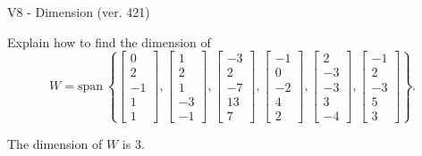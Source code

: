 \begin{exercise}
  \begin{exerciseTitle}V8 - Dimension (ver. 421)\end{exerciseTitle}
  \begin{exerciseStatement}
    Explain how to find the dimension of 
\[W=\mathrm{span}\ \left\{\left[\begin{array}{r}
0 \\
2 \\
-1 \\
1 \\
1
\end{array}\right] , \left[\begin{array}{r}
1 \\
2 \\
1 \\
-3 \\
-1
\end{array}\right] , \left[\begin{array}{r}
-3 \\
2 \\
-7 \\
13 \\
7
\end{array}\right] , \left[\begin{array}{r}
-1 \\
0 \\
-2 \\
4 \\
2
\end{array}\right] , \left[\begin{array}{r}
2 \\
-3 \\
-3 \\
3 \\
-4
\end{array}\right] , \left[\begin{array}{r}
-1 \\
2 \\
-3 \\
5 \\
3
\end{array}\right]\right\}.\]



  \end{exerciseStatement}
  \begin{exerciseAnswer}
   The dimension of \(W\) is  \(3\).
  


  \end{exerciseAnswer}
\end{exercise}